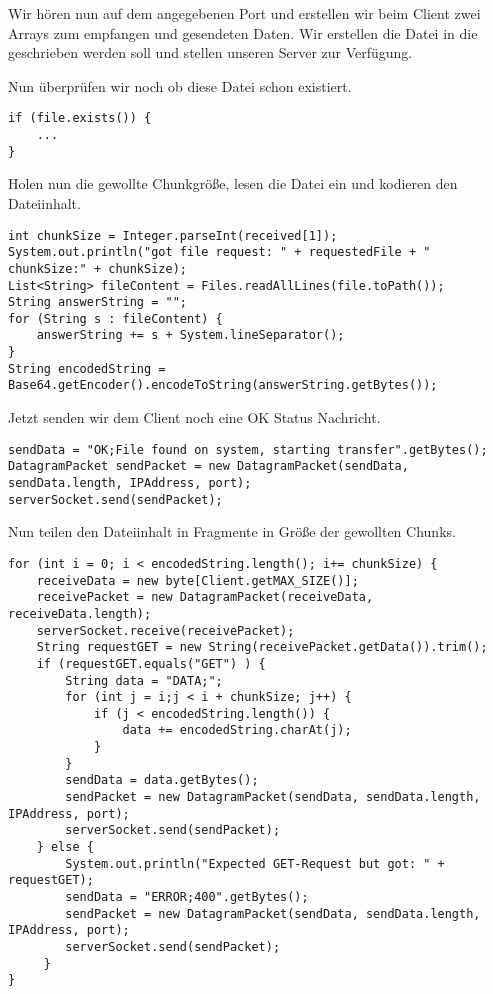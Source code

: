 Wir hören nun auf dem angegebenen Port und erstellen wir beim Client zwei Arrays zum empfangen und gesendeten Daten. Wir erstellen die Datei in die geschrieben werden soll und stellen unseren Server zur Verfügung.

Nun überprüfen wir noch ob diese Datei schon existiert.
  
\begin{lstlisting}
if (file.exists()) {
	...
}
\end{lstlisting}

Holen nun die gewollte Chunkgröße, lesen die Datei ein und kodieren den Dateiinhalt.

\begin{lstlisting}
int chunkSize = Integer.parseInt(received[1]);
System.out.println("got file request: " + requestedFile + " chunkSize:" + chunkSize);
List<String> fileContent = Files.readAllLines(file.toPath());
String answerString = "";
for (String s : fileContent) {
	answerString += s + System.lineSeparator();
}
String encodedString = Base64.getEncoder().encodeToString(answerString.getBytes());
\end{lstlisting}

Jetzt senden wir dem Client noch eine OK Status Nachricht.

\begin{lstlisting}
sendData = "OK;File found on system, starting transfer".getBytes();
DatagramPacket sendPacket = new DatagramPacket(sendData, sendData.length, IPAddress, port);
serverSocket.send(sendPacket);
\end{lstlisting}

Nun teilen den Dateiinhalt in Fragmente in Größe der gewollten Chunks.

\begin{lstlisting}
for (int i = 0; i < encodedString.length(); i+= chunkSize) {
	receiveData = new byte[Client.getMAX_SIZE()];
	receivePacket = new DatagramPacket(receiveData, receiveData.length);
	serverSocket.receive(receivePacket);
	String requestGET = new String(receivePacket.getData()).trim();
	if (requestGET.equals("GET") ) {
		String data = "DATA;";
		for (int j = i;j < i + chunkSize; j++) {
			if (j < encodedString.length()) {
				data += encodedString.charAt(j);
			}
		}
		sendData = data.getBytes();
		sendPacket = new DatagramPacket(sendData, sendData.length, IPAddress, port);
		serverSocket.send(sendPacket);
	} else {
		System.out.println("Expected GET-Request but got: " + requestGET);
		sendData = "ERROR;400".getBytes();
		sendPacket = new DatagramPacket(sendData, sendData.length, IPAddress, port);
		serverSocket.send(sendPacket);
     }
}
\end{lstlisting}

